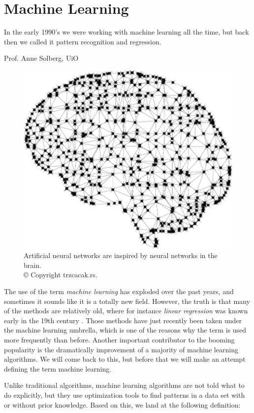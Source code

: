 \chapter{Machine Learning} \label{chp:machinelearning}
\epigraph{In the early 1990's we were working with machine learning all the time, but back then we called it pattern recognition and regression.}{Prof. Anne Solberg, UiO}
\begin{figure}[H]
	\centering
	\includegraphics[scale=0.25]{Images/brain.png}
	\caption{Artificial neural networks are inspired by neural networks in the brain.\\ © Copyright trzcacak.rs.}
\end{figure}

The use of the term \textit{machine learning} has exploded over the past years, and sometimes it sounds like it is a totally new field. However, the truth is that many of the methods are relatively old, where for instance \textit{linear regression} was known early in the 19th century \cite{legendre_nouvelles_1805, gauss_theoria_1809}. Those methods have just recently been taken under the machine learning umbrella, which is one of the reasons why the term is used more frequently than before. Another important contributor to the booming popularity is the dramatically improvement of a majority of machine learning algorithms. We will come back to this, but before that we will make an attempt defining the term machine learning.

Unlike traditional algorithms, machine learning algorithms are not told what to do explicitly, but they use optimization tools to find patterns in a data set with or without prior knowledge. Based on this, we land at the following definition:

